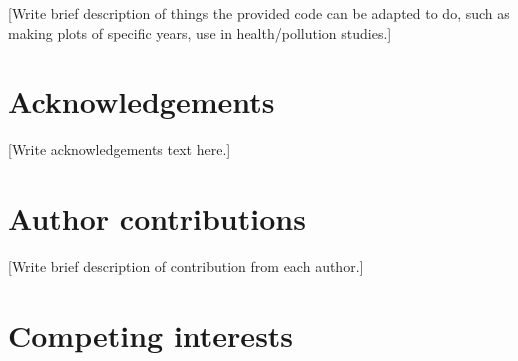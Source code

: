 \documentclass[english]{article}
\begin{document}


[Write brief description of things the provided code can be adapted to do, such as making plots of specific years, use in health/pollution studies.]

\section*{Acknowledgements}


[Write acknowledgements text here.]

\section*{Author contributions}


[Write brief description of contribution from each author.]

\section*{Competing interests}

\end{document}
